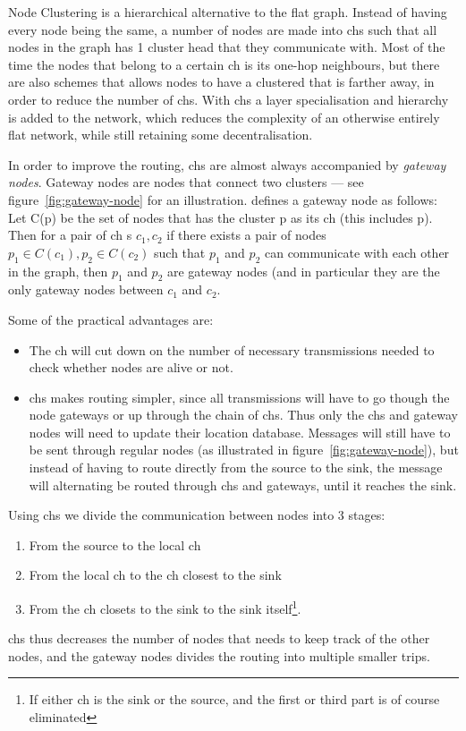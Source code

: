 \label{cluster methods}
Node Clustering is a hierarchical alternative to the flat graph. Instead of having every node being the same, a number of nodes are made into \acp{ch} such that all nodes in the graph has 1 cluster head that they communicate with. Most of the time the nodes that belong to a certain \ac{ch} is its one-hop neighbours, but there are also schemes that allows nodes to have a clustered that is farther away, in order to reduce the number of \acp{ch}. With \acp{ch} a layer specialisation and hierarchy is added to the network, which reduces the complexity of an otherwise entirely flat network, while still retaining some decentralisation.

In order to improve the routing, \acp{ch} are almost always accompanied by \emph{gateway nodes}. Gateway nodes are nodes that connect two clusters --- see figure~\ref{fig:gateway-node} for an illustration. \cite{spanners} defines a gateway node as follows:
Let C(p) be the set of nodes that has the cluster p as its \ac{ch} (this includes p). Then for a pair of \ac{ch} s $c_1, c_2$ if there exists a pair of nodes $p_1 \in C(c_1), p_2 \in C(c_2)$ such that $p_1$ and $p_2$ can communicate with each other in the graph, then $p_1$ and $p_2$ are gateway nodes (and in particular they are the only gateway nodes between $c_1$ and $c_2$.  

Some of the practical advantages are:
\begin{itemize}
\item The \ac{ch} will cut down on the number of necessary transmissions needed to check whether nodes are alive or not.
\item \acp{ch} makes routing simpler, since all transmissions will have to go though the node gateways or up through the chain of \acp{ch}. Thus only the \acp{ch} and gateway nodes will need to update their location database. Messages will still have to be sent through regular nodes (as illustrated in figure~\ref{fig:gateway-node}), but instead of having to route directly from the source to the sink, the message will alternating be routed through \acp{ch} and gateways, until it reaches the sink.
\end{itemize}

Using \acp{ch} we divide the communication between nodes into 3 stages:
\begin{enumerate}
\item From the source to the local \ac{ch} 
\item From the local \ac{ch} to the \ac{ch} closest to the sink
\item From the \ac{ch} closets to the sink to the sink itself\footnote{If either \ac{ch} is the sink or the source, and the first or third part is of course eliminated}.
\end{enumerate}
 \acp{ch} thus decreases the number of nodes that needs to keep track of the other nodes, and the gateway nodes divides the routing into multiple smaller trips.  

